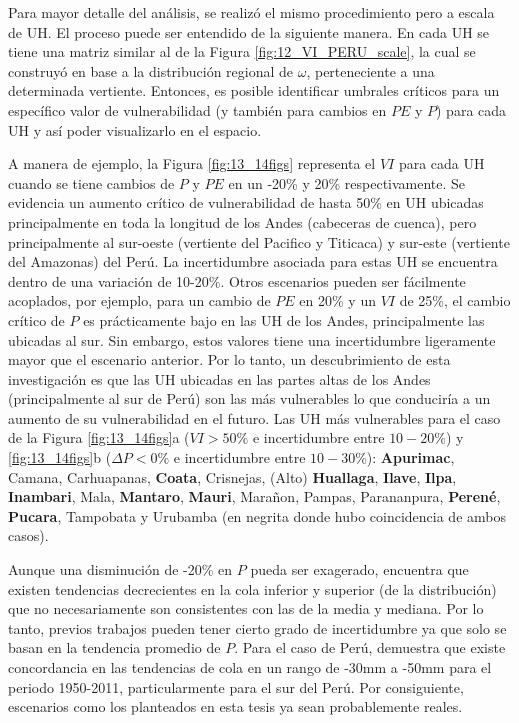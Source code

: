 \documentclass[12pt]{article}
\begin{document}
\thispagestyle{empty}

Para mayor detalle del análisis, se realizó el mismo procedimiento pero a escala de UH. El proceso puede ser entendido de la siguiente manera. En cada UH se tiene una matriz similar al de la Figura \ref{fig:12_VI_PERU_scale}, la cual se construyó en base a la distribución regional de $\omega$, perteneciente a una determinada vertiente. Entonces, es posible identificar umbrales críticos para un específico valor de vulnerabilidad (y también para cambios en $PE$ y $P$) para cada UH y así poder visualizarlo en el espacio. 

A manera de ejemplo, la Figura \ref{fig:13_14figs} representa el $VI$ para cada UH cuando se tiene cambios de $P$ y $PE$ en un -20\% y 20\% respectivamente. Se evidencia un aumento crítico de vulnerabilidad de hasta 50\% en UH ubicadas principalmente en toda la longitud de los Andes (cabeceras de cuenca), pero principalmente al sur-oeste (vertiente del Pacifico y Titicaca) y sur-este (vertiente del Amazonas) del Perú. La incertidumbre asociada para estas UH se encuentra dentro de una variación de 10-20\%. Otros escenarios pueden ser fácilmente acoplados, por ejemplo, para un cambio de $PE$ en 20\% y un $VI$ de 25\%, el cambio crítico de $P$ es prácticamente bajo en las UH de los Andes, principalmente las ubicadas al sur. Sin embargo, estos valores tiene una incertidumbre ligeramente mayor que el escenario anterior. Por lo tanto, un descubrimiento de esta investigación es que las UH ubicadas en las partes altas de los Andes (principalmente al sur de Perú) son las más vulnerables lo que conduciría a un aumento de su vulnerabilidad en el futuro. Las UH más vulnerables para el caso de la Figura \ref{fig:13_14figs}a ($VI > 50\%$ e incertidumbre entre $10-20\%$) y \ref{fig:13_14figs}b ($\Delta P < 0\%$ e incertidumbre entre $10-30\%$): \textbf{Apurimac}, Camana, Carhuapanas, \textbf{Coata}, Crisnejas, (Alto) \textbf{Huallaga}, \textbf{Ilave}, \textbf{Ilpa}, \textbf{Inambari}, Mala, \textbf{Mantaro}, \textbf{Mauri}, Marañon, Pampas, Parananpura, \textbf{Perené}, \textbf{Pucara}, Tampobata y Urubamba (en negrita donde hubo coincidencia de ambos casos).

Aunque una disminución de -20\% en $P$ pueda ser exagerado, \citet{lausier2018overlooked} encuentra que existen tendencias decrecientes en la cola inferior y superior (de la distribución) que no necesariamente son consistentes con las de la media y mediana. Por lo tanto, previos trabajos pueden tener cierto grado de incertidumbre ya que solo se basan en la tendencia promedio de $P$. Para el caso de Perú, \citet{lausier2018overlooked} demuestra que existe concordancia en las tendencias de cola en un rango de -30mm a -50mm para el periodo 1950-2011, particularmente para el sur del Perú. Por consiguiente, escenarios como los planteados en esta tesis ya sean probablemente reales.
\end{document}
